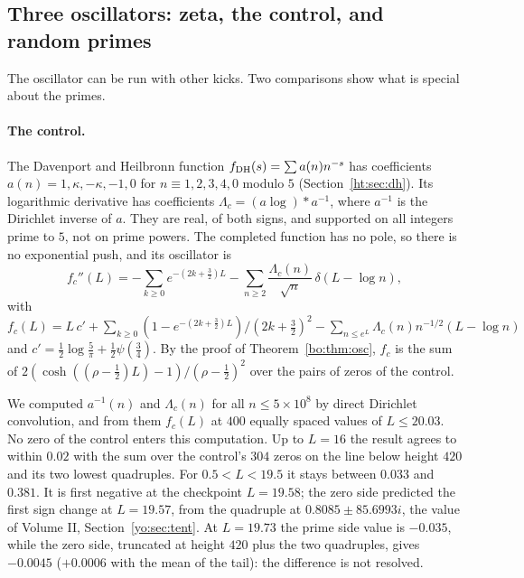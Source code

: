 \subsection{Three oscillators: zeta, the control, and random primes}

The oscillator can be run with other kicks. Two comparisons show what is special about the primes.

\paragraph{The control.} The Davenport and Heilbronn function $f_{\rm DH}(s)=\sum a(n)n^{-s}$ has coefficients $a(n)=1,\kappa,-\kappa,-1,0$ for $n\equiv1,2,3,4,0$ modulo $5$ (Section~\ref{ht:sec:dh}). Its logarithmic derivative has coefficients $\Lambda_c=(a\log)*a^{-1}$, where $a^{-1}$ is the Dirichlet inverse of $a$. They are real, of both signs, and supported on all integers prime to $5$, not on prime powers. The completed function has no pole, so there is no exponential push, and its oscillator is
\[
f_c''(L)=-\sum_{k\ge0}e^{-(2k+\frac32)L}-\sum_{n\ge2}\frac{\Lambda_c(n)}{\sqrt n}\,\delta(L-\log n),
\]
with $f_c(L)=L\,c'+\sum_{k\ge0}(1-e^{-(2k+\frac32)L})/(2k+\frac32)^2-\sum_{n\le e^L}\Lambda_c(n)n^{-1/2}(L-\log n)$ and $c'=\frac12\log\frac5\pi+\frac12\psi(\frac34)$. By the proof of Theorem~\ref{bo:thm:osc}, $f_c$ is the sum of $2(\cosh((\rho-\frac12)L)-1)/(\rho-\frac12)^2$ over the pairs of zeros of the control.

\begin{remark}[Computation]\label{bo:comp:controlosc}
We computed $a^{-1}(n)$ and $\Lambda_c(n)$ for all $n\le5\times10^8$ by direct Dirichlet convolution, and from them $f_c(L)$ at $400$ equally spaced values of $L\le20.03$. No zero of the control enters this computation. Up to $L=16$ the result agrees to within $0.02$ with the sum over the control's $304$ zeros on the line below height $420$ and its two lowest quadruples. For $0.5<L<19.5$ it stays between $0.033$ and $0.381$. It is first negative at the checkpoint $L=19.58$; the zero side predicted the first sign change at $L=19.57$, from the quadruple at $0.8085\pm85.6993i$, the value of Volume II, Section~\ref{yo:sec:tent}. At $L=19.73$ the prime side value is $-0.035$, while the zero side, truncated at height $420$ plus the two quadruples, gives $-0.0045$ ($+0.0006$ with the mean of the tail): the difference is not resolved. %
\end{remark}


